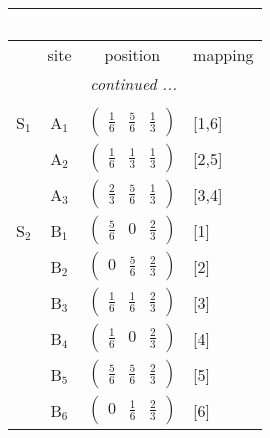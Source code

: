 \documentclass[fleqn,10pt,landscape]{article}
\begin{document}
\begin{itemize}
\begin{center}
\begin{longtable}{cc|c|l}
\multicolumn{3}{l}{\tablename\ \thetable{}} \\
 \hline \hline
 & site & position & mapping \\ \hline \endhead

 \hline \hline
\multicolumn{3}{r}{\footnotesize\it continued ...} \\ \endfoot

 \hline \hline
\multicolumn{3}{r}{} \\ \endlastfoot

S$_{1}$ & A$_1$ & $\begin{pmatrix} \frac{1}{6} & \frac{5}{6} & \frac{1}{3} \end{pmatrix}$ & [1,6] \\
& A$_2$ & $\begin{pmatrix} \frac{1}{6} & \frac{1}{3} & \frac{1}{3} \end{pmatrix}$ & [2,5] \\
& A$_3$ & $\begin{pmatrix} \frac{2}{3} & \frac{5}{6} & \frac{1}{3} \end{pmatrix}$ & [3,4] \\ \hline
S$_{2}$ & B$_1$ & $\begin{pmatrix} \frac{5}{6} & 0 & \frac{2}{3} \end{pmatrix}$ & [1] \\
& B$_2$ & $\begin{pmatrix} 0 & \frac{5}{6} & \frac{2}{3} \end{pmatrix}$ & [2] \\
& B$_3$ & $\begin{pmatrix} \frac{1}{6} & \frac{1}{6} & \frac{2}{3} \end{pmatrix}$ & [3] \\
& B$_4$ & $\begin{pmatrix} \frac{1}{6} & 0 & \frac{2}{3} \end{pmatrix}$ & [4] \\
& B$_5$ & $\begin{pmatrix} \frac{5}{6} & \frac{5}{6} & \frac{2}{3} \end{pmatrix}$ & [5] \\
& B$_6$ & $\begin{pmatrix} 0 & \frac{1}{6} & \frac{2}{3} \end{pmatrix}$ & [6] \\
\end{longtable}
\end{center}


\end{itemize}
\end{document}
